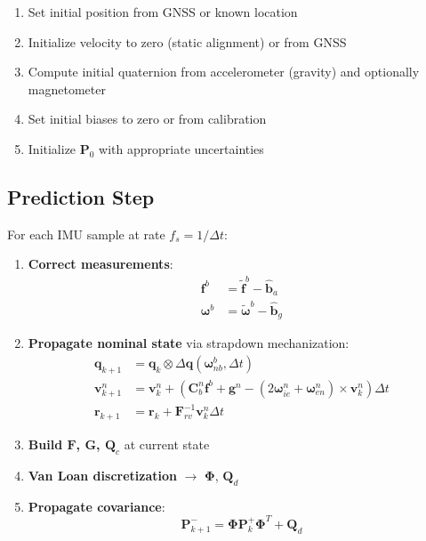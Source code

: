 \documentclass[11pt,a4paper]{article}
\newcommand{\mat}[1]{\mathbf{#1}}
\newcommand{\vect}[1]{\boldsymbol{#1}}
\newcommand{\quat}[1]{\mathbf{#1}}
\begin{document}
\begin{enumerate}
    \item Set initial position from GNSS or known location
    \item Initialize velocity to zero (static alignment) or from GNSS
    \item Compute initial quaternion from accelerometer (gravity) and optionally magnetometer
    \item Set initial biases to zero or from calibration
    \item Initialize $\mat{P}_0$ with appropriate uncertainties
\end{enumerate}

\subsection{Prediction Step}

For each IMU sample at rate $f_s = 1/\Delta t$:

\begin{enumerate}
    \item \textbf{Correct measurements}:
    \begin{align}
        \mat{f}^b &= \tilde{\mat{f}}^b - \hat{\mat{b}}_a \\
        \vect{\omega}^b &= \tilde{\vect{\omega}}^b - \hat{\mat{b}}_g
    \end{align}
    
    \item \textbf{Propagate nominal state} via strapdown mechanization:
    \begin{align}
        \quat{q}_{k+1} &= \quat{q}_k \otimes \Delta\quat{q}(\vect{\omega}_{nb}^b, \Delta t) \\
        \mat{v}_{k+1}^n &= \mat{v}_k^n + (\mat{C}_b^n \mat{f}^b + \mat{g}^n - (2\vect{\omega}_{ie}^n + \vect{\omega}_{en}^n) \times \mat{v}_k^n)\Delta t \\
        \mat{r}_{k+1} &= \mat{r}_k + \mat{F}_{rv}^{-1}\mat{v}_k^n \Delta t
    \end{align}
    
    \item \textbf{Build $\mat{F}$, $\mat{G}$, $\mat{Q}_c$} at current state
    
    \item \textbf{Van Loan discretization} $\rightarrow$ $\vect{\Phi}$, $\mat{Q}_d$
    
    \item \textbf{Propagate covariance}:
    \begin{equation}
        \mat{P}_{k+1}^- = \vect{\Phi}\mat{P}_k^+\vect{\Phi}^T + \mat{Q}_d
    \end{equation}
\end{enumerate}
\end{document}
